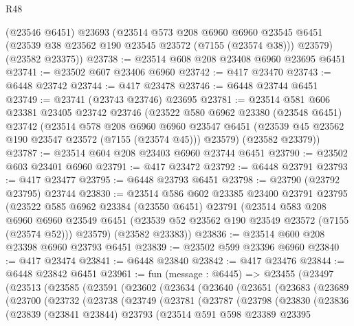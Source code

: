 \begin{lexlean}{R48}
\begin{coremodule}
      (@23546 @6451)
      @23693
      (@23514
        @573
        @208
        @6960
        @6960
        @23545
        @6451
        (@23539 @38 @23562 @190 @23545 @23572 (@7155 (@23574 @38)))
        @23579)
      (@23582 @23375))
@23738 := @23514 @608 @208 @23408 @6960 @23695 @6451
@23741 := @23502 @607 @23406 @6960
@23742 := @417 @23470
@23743 := @6448 @23742
@23744 := @417 @23478
@23746 := @6448 @23744 @6451
@23749 := @23741 (@23743 @23746) @23695
@23781 := @23514
    @581
    @606
    @23381
    @23405
    @23742
    @23746
    (@23522
      @580
      @6962
      @23380
      (@23548 @6451)
      @23742
      (@23514
        @578
        @208
        @6960
        @6960
        @23547
        @6451
        (@23539 @45 @23562 @190 @23547 @23572 (@7155 (@23574 @45)))
        @23579)
      (@23582 @23379))
@23787 := @23514 @604 @208 @23403 @6960 @23744 @6451
@23790 := @23502 @603 @23401 @6960
@23791 := @417 @23472
@23792 := @6448 @23791
@23793 := @417 @23477
@23795 := @6448 @23793 @6451
@23798 := @23790 (@23792 @23795) @23744
@23830 := @23514
    @586
    @602
    @23385
    @23400
    @23791
    @23795
    (@23522
      @585
      @6962
      @23384
      (@23550 @6451)
      @23791
      (@23514
        @583
        @208
        @6960
        @6960
        @23549
        @6451
        (@23539 @52 @23562 @190 @23549 @23572 (@7155 (@23574 @52)))
        @23579)
      (@23582 @23383))
@23836 := @23514 @600 @208 @23398 @6960 @23793 @6451
@23839 := @23502 @599 @23396 @6960
@23840 := @417 @23474
@23841 := @6448 @23840
@23842 := @417 @23476
@23844 := @6448 @23842 @6451
@23961 := fun (message : @6445) =>
  @23455
    (@23497
      (@23513
        (@23585
          (@23591
            (@23602
              (@23634
                (@23640
                  (@23651
                    (@23683
                      (@23689
                        (@23700
                          (@23732
                            (@23738
                              (@23749
                                (@23781
                                  (@23787
                                    (@23798
                                      (@23830
                                        (@23836
                                          (@23839
                                            (@23841 @23844)
                                            @23793
                                            (@23514
                                              @591
                                              @598
                                              @23389
                                              @23395

\end{coremodule}
\end{lexlean}

